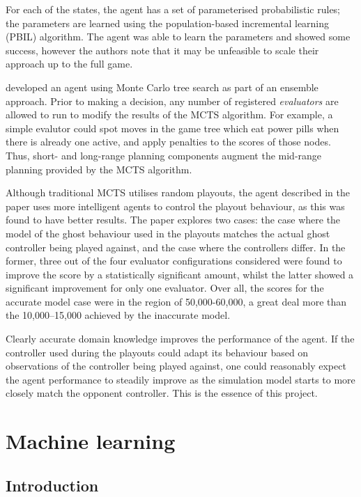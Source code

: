 For each of the states, the agent has a set of parameterised probabilistic rules; the parameters are learned using the population-based incremental learning (PBIL) algorithm.  The agent was able to learn the parameters and showed some success, however the authors note that it may be unfeasible to scale their approach up to the full game.


\citet{Me2012} developed an agent using Monte Carlo tree search as part of an ensemble approach.  Prior to making a decision, any number of registered \emph{evaluators} are allowed to run to modify the results of the MCTS algorithm.  For example, a simple evalutor could spot moves in the game tree which eat power pills when there is already one active, and apply penalties to the scores of those nodes.  Thus, short- and long-range planning components augment the mid-range planning provided by the MCTS algorithm.

Although traditional MCTS utilises random playouts, the agent described in the paper uses more intelligent agents to control the playout behaviour, as this was found to have better results.  The paper explores two cases: the case where the model of the ghost behaviour used in the playouts matches the actual ghost controller being played against, and the case where the controllers differ.  In the former, three out of the four evaluator configurations considered were found to improve the score by a statistically significant amount, whilst the latter showed a significant improvement for only one evaluator.  Over all, the scores for the accurate model case were in the region of 50,000-60,000, a great deal more than the 10,000--15,000 achieved by the inaccurate model.

Clearly accurate domain knowledge improves the performance of the agent.  If the controller used during the playouts could adapt its behaviour based on observations of the controller being played against, one could reasonably expect the agent performance to steadily improve as the simulation model starts to more closely match the opponent controller.  This is the essence of this project.

\section{Machine learning}

\subsection{Introduction}

